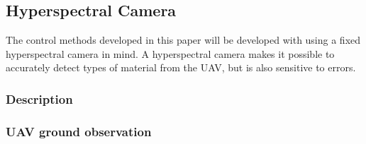 \subsection{Hyperspectral Camera}
The control methods developed in this paper will be developed with using a fixed hyperspectral camera in mind. A hyperspectral camera makes it possible to accurately detect types of material from the UAV, but is also sensitive to errors.

\subsubsection{Description}



\subsubsection{UAV ground observation}